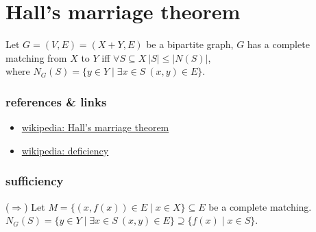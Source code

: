 \documentclass{article}
\begin{document}
\tableofcontents

\newpage
\section{Hall's marriage theorem}
Let $G=(V,E)=(X+Y,E)$ be a bipartite graph, $G$ has a complete matching from $X$ to $Y$ iff $\forall S\subseteq X\ |S|\leq |N(S)|$,\\
where $N_G(S)=\{y\in Y\mid \exists x\in S\ (x,y)\in E\}$.

\subsubsection{references \& links}

\begin{itemize}
	\item \href{https://en.wikipedia.org/wiki/Hall\%27s\_marriage\_theorem}{wikipedia: Hall's marriage theorem}
	\item \href{https://en.wikipedia.org/wiki/Deficiency_(graph_theory)}{wikipedia: deficiency}
\end{itemize}


\subsubsection{sufficiency}
($\Rightarrow$)\quad
Let $M=\{(x,f(x))\in E\mid x\in X\}\subseteq E$ be a complete matching.\\
$N_G(S)=\{y\in Y\mid \exists x\in S\ (x,y)\in E\}\supseteq \{f(x)\mid x\in S\}$.
\end{document}
